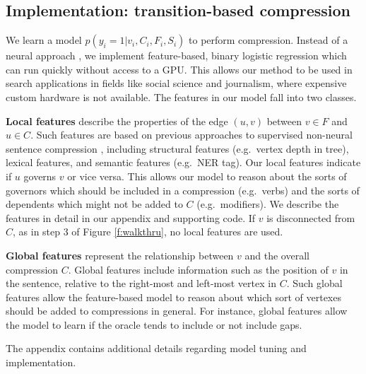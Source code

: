 \documentclass[11pt,a4paper]{article}
\begin{document}

\subsection{Implementation: transition-based compression}\label{s:transition}

We learn a model $p(y_i  = 1 | v_i, C_i, F_i, S_i)$ to perform compression. Instead of a neural approach \cite{D14-1082}, we implement feature-based, binary logistic regression which can run quickly without access to a GPU. This allows our method to be used in search applications in fields like social science and journalism, where expensive custom hardware is not available. The features in our model fall into two classes.

\textbf{Local features} describe the properties of the edge $(u,v)$ between $v \in F$ and $u \in C$. Such features are based on previous approaches to supervised non-neural sentence compression \cite{filippova2013overcoming,almeida2013fast,Filippova2015FastKS}, including structural features (e.g.~vertex depth in tree), lexical features, and semantic features (e.g.~NER tag). Our local features indicate if $u$ governs $v$ or vice versa. This allows our model to reason about the sorts of governors which should be included in a compression (e.g.~verbs) and the sorts of dependents which might not be added to $C$ (e.g.~modifiers). We describe the features in detail in our appendix and supporting code. If $v$ is disconnected from $C$, as in step 3 of Figure \ref{f:walkthru}, no local features are used.

\textbf{Global features} represent the relationship between $v$ and the overall compression $C$. Global features include information such as the position of $v$ in the sentence, relative to the right-most and left-most vertex in $C$. Such global features allow the feature-based model to reason about which sort of vertexes should be added to compressions in general. For instance, global features allow the model to learn if the oracle tends to include or not include gaps.

The appendix contains additional details regarding model tuning and implementation.
\end{document}
